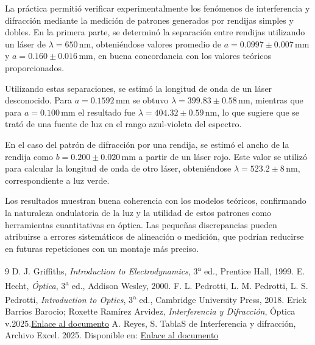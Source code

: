 \documentclass[article,12pt]{elsarticle}
\begin{document}
La práctica permitió verificar experimentalmente los fenómenos de interferencia y difracción mediante la medición de patrones generados por rendijas simples y dobles. En la primera parte, se determinó la separación entre rendijas utilizando un láser de $\lambda = 650\, \text{nm}$, obteniéndose valores promedio de $a = 0.0997 \pm 0.007\, \text{mm}$ y $a = 0.160 \pm 0.016\, \text{mm}$, en buena concordancia con los valores teóricos proporcionados.

Utilizando estas separaciones, se estimó la longitud de onda de un láser desconocido. Para $a = 0.1592\, \text{mm}$ se obtuvo $\lambda = 399.83 \pm 0.58\, \text{nm}$, mientras que para $a = 0.100\, \text{mm}$ el resultado fue $\lambda = 404.32 \pm 0.59\, \text{nm}$, lo que sugiere que se trató de una fuente de luz en el rango azul-violeta del espectro.

En el caso del patrón de difracción por una rendija, se estimó el ancho de la rendija como $b = 0.200 \pm 0.020\, \text{mm}$ a partir de un láser rojo. Este valor se utilizó para calcular la longitud de onda de otro láser, obteniéndose $\lambda = 523.2 \pm 8\, \text{nm}$, correspondiente a luz verde.

Los resultados muestran buena coherencia con los modelos teóricos, confirmando la naturaleza ondulatoria de la luz y la utilidad de estos patrones como herramientas cuantitativas en óptica. Las pequeñas discrepancias pueden atribuirse a errores sistemáticos de alineación o medición, que podrían reducirse en futuras repeticiones con un montaje más preciso.


\begin{thebibliography}{9}
 D. J. Griffiths, \textit{Introduction to Electrodynamics}, 3\textsuperscript{a} ed., Prentice Hall, 1999.
 E. Hecht, \textit{Óptica}, 3\textsuperscript{a} ed., Addison Wesley, 2000.
 F. L. Pedrotti, L. M. Pedrotti, L. S. Pedrotti, \textit{Introduction to Optics}, 3\textsuperscript{a} ed., Cambridge University Press, 2018.
 Erick Barrios Barocio; Roxette Ramírez Arvidez, \textit{Interferencia y Difracción}, Óptica v.2025.\href{https://tsikbal.github.io/P%C3%A1ginas/%C3%81reas/F%C3%ADsica/%C3%93ptica/Optica_Fisica/Difracci%C3%B3n%20e%20Interferencia.html}{Enlace al documento}
 A. Reyes, S. TablaS de Interferencia y difracción, Archivo Excel. 2025. Disponible en: \href{https://docs.google.com/spreadsheets/d/1XihNQc4zVtCAMRpLWDN6WFEjftBAhXA2/edit?usp=sharing&ouid=112625838925660900694&rtpof=true&sd=true}{Enlace al documento}
\end{thebibliography}
\end{document}
